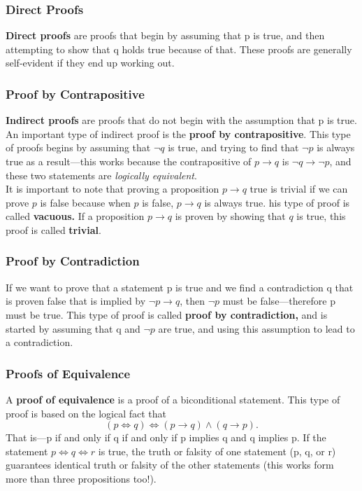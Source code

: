 \documentclass[12pt,letterpaper]{article}
\begin{document}
\subsubsection{Direct Proofs}

\textbf{Direct proofs} are proofs that begin by assuming that p is true, and then attempting to show that q holds true because of that. These proofs are generally self-evident if they end up working out.

\subsubsection{Proof by Contrapositive}

\textbf{Indirect proofs} are proofs that do not begin with the assumption that p is true. An important type of indirect proof is the \textbf{proof by contrapositive}. This type of proofs begins by assuming that $\lnot q$ is true, and trying to find that $\lnot p$ is always true as a result---this works because the contrapositive of $p \rightarrow q$ is $\lnot q \rightarrow \lnot p$, and these two statements are \textit{logically equivalent}. \\

It is important to note that proving a proposition $p \rightarrow q$ true is trivial if we can prove $p$ is false because when $p$ is false, $p \rightarrow q$ is always true. his type of proof is called \textbf{vacuous.} If a proposition $p \rightarrow q$ is proven by showing that $q$ is true, this proof is called \textbf{trivial}.

\subsubsection{Proof by Contradiction}

If we want to prove that a statement p is true and we find a contradiction q that is proven false that is implied by $\lnot p \rightarrow q$, then $\lnot p$ must be false---therefore p must be true. This type of proof is called \textbf{proof by contradiction,} and is started by assuming that q and $\lnot p$ are true, and using this assumption to lead to a contradiction.

\subsubsection{Proofs of Equivalence}

A \textbf{proof of equivalence} is a proof of a biconditional statement. This type of proof is based on the logical fact that $$(p \iff q) \iff (p \rightarrow q)\wedge(q \rightarrow p).$$ That is---p if and only if q if and only if p implies q and q implies p. If the statement $p \iff q \iff r$ is true, the truth or falsity of one statement (p, q, or r) guarantees identical truth or falsity of the other statements (this works form more than three propositions too!).
\end{document}
